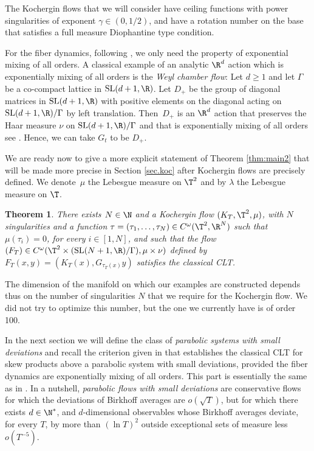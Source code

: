 \documentclass[10pt]{amsart}
\newcommand\SL{\mathrm{SL}}
\theoremstyle{definition}
\theoremstyle{plain}
\newtheorem{Main}{Theorem}
\begin{document}
The Kochergin flows that we will consider have ceiling functions with power singularities of exponent $\gamma\in (0,1/2)$, and have a rotation number on the base that satisfies a full measure Diophantine type condition.

For the fiber dynamics, following \cite{DDKN}, we only need the property of exponential mixing of all orders.
A classical example of an analytic $\R^d$ action which is exponentially mixing of all orders is the \emph{Weyl chamber flow}: Let $d\geq 1$ and let $\Gamma$ be a co-compact lattice in $\SL(d+1,\R)$. Let $D_+$ be the group of diagonal matrices in $\SL(d+1,\R)$ with positive elements on the diagonal acting on $\SL(d+1,\R)/\Gamma$ by left translation. Then~$D_+$ is an $\R^d$ action that preserves the Haar measure $\nu$ on $\SL(d+1,\R)/\Gamma$ and that is exponentially mixing of all orders see \eg \cite{BEG}. Hence, we can take $G_t$ to be $D_+$.

We are ready now to give a more explicit statement of Theorem \ref{thm:main2} that will be made more precise in Section \ref{sec.koc} after Kochergin flows are precisely defined. We denote~$\mu$ the Lebesgue measure on $\T^2$ and by $\lambda$ the Lebesgue measure on $\T$.

\begin{Main} \label{thm:main22} There exists $N\in \N$ and a Kochergin flow $(K_T,\T^2,\mu)$,
with $N$ singularities and a function $\tau=(\tau_1,\ldots,\tau_{N}) \in C^\omega(\T^2,\R^{N})$ such that $\mu(\tau_i)=0$, for every $i\in [1,N]$, and such that the flow
$(F_T)\in C^\omega(\T^2\times (\SL(N+1,\R)/\Gamma),\mu\times \nu)$
defined by $F_T(x,y)=(K_T(x),G_{\tau_T(x)}y)$
satisfies the classical CLT.
\end{Main}

The dimension of the manifold on which our examples are constructed depends thus on the number of singularities $N$ that we require for the Kochergin flow. We did not try to optimize this number, but the one we currently have is of order 100.

In the next section we will define the class of {\it parabolic systems with small deviations} and recall the criterion given in \cite{DDKN} that establishes the classical CLT for skew products above a parabolic system with small deviations, provided the fiber dynamics are exponentially mixing of all orders. This part is essentially the same as in \cite{DDKN}. In a nutshell, {\it parabolic flows with small deviations} are conservative flows for which the deviations of Birkhoff averages are $o(\sqrt{T})$, but for which there exists $d \in \N^*$, and $d$-dimensional observables whose Birkhoff averages deviate, for every $T$, by more than $(\ln T)^2$ outside exceptional sets of measure less $o(T^{-5})$.
\end{document}
